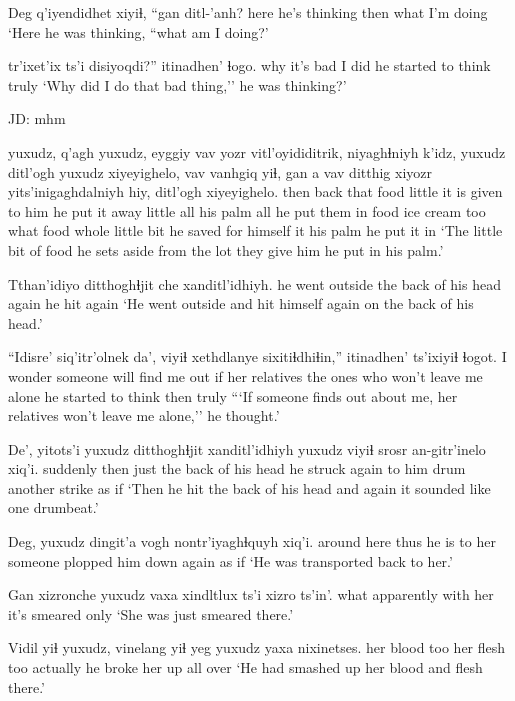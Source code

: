 \documentclass[12pt]{article}
\begin{document}
\gll Deg  q'iyendidhet  xiyiɬ, ``gan  ditl-'anh?
here {he's thinking} then  what {I'm doing}
\glt `Here he was thinking, ``what am I doing?'
\glend

 tr'ixet'ix ts'i disiyoqdi?'' itinadhen'      ɬogo.
why         {it's bad}  {}   {I did}    {he started to think} truly
\glt `Why did I do that bad thing,'' he was thinking?'
\glend

JD:  mhm

 yuxudz, q'agh yuxudz, eyggiy vav yozr vitl'oyididitrik, niyaghɬniyh    k'idz, yuxudz ditl'ogh yuxudz xiyeyighelo,    vav  vanhgiq   yiɬ, gan  a vav  ditthig xiyozr     yits'inigaghdalniyh hiy, ditl'ogh xiyeyighelo.
then            {}      back  {}     that  food little {it is given to him} {he put it away} little all    {his palm} all  {he put them in} food {ice cream} too what {} food whole   {little bit} {he saved for himself} it {his palm} {he put it in}
\glt `The little bit of food he sets aside from the lot they give him he put in his palm.'
\glend

\gll Tthan'idiyo     ditthoghɬjit che    xanditl'idhiyh.
{he went outside} {the back of his head} again {he hit again}
\glt `He went outside and hit himself again on the back of his head.'
\glend

\gll ``Idisre'  siq'itr'olnek            da', {viyiɬ xethdlanye} {sixitiɬdhiɬin},''         itinadhen' ts'ixiyiɬ ɬogot.
{I wonder} {someone will find me out} if {her relatives}    {the ones who won't leave me alone} {he started to think} then truly
\glt ```If someone finds out about me, her relatives won't leave me alone,'' he thought.'
\glend

\gll De', yitots'i yuxudz ditthoghɬjit     xanditl'idhiyh yuxudz viyiɬ  srosr an-gitr'inelo xiq'i.
suddenly then  just {the back of his head} {he struck again} {} {to him} drum  {another strike} {as if}
\glt `Then he hit the back of his head and again it sounded like one drumbeat.'
\glend

\gll Deg, yuxudz dingit'a vogh   nontr'iyaghɬquyh xiq'i.
{around here}   thus {he is}    {to her} {someone plopped him down again} {as if}
\glt `He was transported back to her.'
\glend

\gll Gan  xizronche yuxudz vaxa    xindltlux    ts'i xizro ts'in'.
what apparently {}    {with her} {it's smeared} {} only
\glt `She was just smeared there.'
\glend

\gll Vidil     yiɬ yuxudz, vinelang  yiɬ {yeg yuxudz} {yaxa nixinetses.}
{her blood} too {}    {her flesh} too   actually    {he broke her up all over}
\glt `He had smashed up her blood and flesh there.'
\glend
\end{document}
